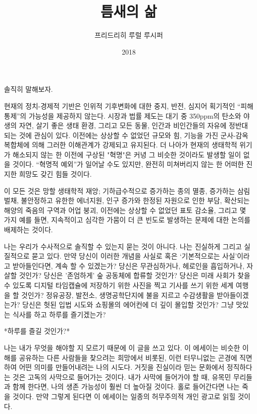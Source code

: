 \documentclass[11pt, b6paper, openany]{memoir}
\title{틈새의 삶}
\author{프리드리히 루럴 루시퍼}
\date{2018}
\begin{document}
\frontmatter
\begin{titlingpage}
\begin{flushleft}
\maketitle
\end{flushleft}
\end{titlingpage}
\tableofcontents

\mainmatter
\begin{article}

솔직히 말해보자. 

현재의 정치-경제적 기반은 인위적 기후변화에 대한 중지, 반전, 심지어 획기적인 “피해 통제”의 가능성을 제공하지 않는다. 시장과 법률 제도는 대기 중 350ppm의 탄소와 야생의 자연, 살기 좋은 생태 환경, 그리고 모든 동물, 인간과 비인간들의 자유에 정반대되는 것에 관심이 있다. 이전에는 상상할 수 없었던 규모와 힘, 기능을 가진 군사-감옥 복합체에 의해 그러한 이해관계가 강제되고 유지된다. 더 나아가 현재의 생태학적 위기가 해소되지 않는 한 이전에 구상된 "혁명"은 커녕 그 비슷한 것이라도 발생할 일이 없을 것이다. “혁명적 예외”가 일어날 수도 있지만, 완전히 미쳐버리지 않는 한 어떠한 진지한 희망도 갖긴 힘들 것이다.

이 모든 것은 망할 생태학적 재앙; 기하급수적으로 증가하는 종의 멸종, 증가하는 삼림 벌채, 불안정하고 유한한 에너지원, 인구 증가와 한정된 자원으로 인한 부담, 확산되는 해양의 죽음의 구역과 어업 붕괴, 이전에는 상상할 수 없었던 표토 감소율, 그리고 몇 가지 예를 들면, 지속적이고 심각한 가뭄이 더 큰 빈도로 발생하는 문제에 대한 논의를 배제하는 것이다. 

나는 우리가 수사적으로 솔직할 수 있는지 묻는 것이 아니다. 나는 진실하게 그리고 실질적으로 묻고 있다. 만약 당신이 이러한 개념을 사실로 혹은 ‘기본적으로는 사실’이라고 받아들인다면, 계속 할 수 있겠는가? 당신은 무관심하거나, 헤로인을 흡입하거나, 자살할 것인가? 당신은 '존엄하게' 숲 공동체에 합류할 것인가? 당신은 미래 사회가 찾을 수 있도록 디지털 타임캡슐에 저장하기 위한 사진을 찍고 기사를 쓰기 위한 세계 여행을 할 것인가? 정유공장, 발전소, 생명공학단지에 불을 지르고 수감생활을 받아들이겠는가? 당신은 헛된 입법 시도와 쇼핑몰의 에어컨에 더 깊이 몰입할 것인가? 그냥 맛있는 식사를 하고 하루를 즐기겠는가?

*하루를 즐길 것인가?*

나는 내가 무엇을 해야할 지 모르기 때문에 이 글을 쓰고 있다. 이 에세이는 비슷한 이해를 공유하는 다른 사람들을 찾으려는 희망에서 비롯된, 이런 터무니없는 곤경에 직면하여 어떤 의미를 만들어내려는 나의 시도다. 거짓을 진실이라 믿는 문화에서 정직하다는 것은 고독의 사막으로 들어가는 것이다. 내가 사막에 들어가야 할 때, 유목민 무리들과 함께 한다면, 나의 생존 가능성이 훨씬 더 높아질 것이다. 홀로 들어간다면 나는 죽을 것이다. 만약 그렇게 된다면 이 에세이는 일종의 허무주의적 개인 광고로 읽힐 것이다.


\end{article}
\end{document}
